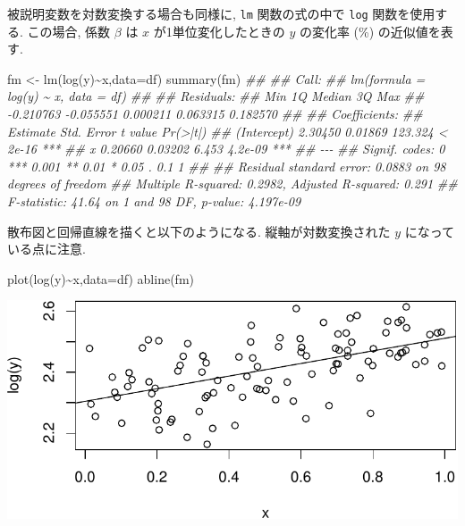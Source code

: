\documentclass[
  letterpaper,
  xelatex,
  ja=standard, xelatex]{bxjsbook}
\newenvironment{Shaded}{\begin{snugshade}}{\end{snugshade}}
\newcommand{\AttributeTok}[1]{\textcolor[rgb]{0.40,0.45,0.13}{#1}}
\newcommand{\DocumentationTok}[1]{\textcolor[rgb]{0.37,0.37,0.37}{\textit{#1}}}
\newcommand{\FunctionTok}[1]{\textcolor[rgb]{0.28,0.35,0.67}{#1}}
\newcommand{\NormalTok}[1]{\textcolor[rgb]{0.00,0.23,0.31}{#1}}
\newcommand{\OtherTok}[1]{\textcolor[rgb]{0.00,0.23,0.31}{#1}}
\newcommand{\SpecialCharTok}[1]{\textcolor[rgb]{0.37,0.37,0.37}{#1}}
\begin{document}
被説明変数を対数変換する場合も同様に, \texttt{lm} 関数の式の中で
\texttt{log} 関数を使用する. この場合, 係数 \(\beta\) は \(x\)
が1単位変化したときの \(y\) の変化率 (\%) の近似値を表す.

\begin{Shaded}
\begin{Highlighting}[]
\NormalTok{fm }\OtherTok{\textless{}{-}} \FunctionTok{lm}\NormalTok{(}\FunctionTok{log}\NormalTok{(y)}\SpecialCharTok{\textasciitilde{}}\NormalTok{x,}\AttributeTok{data=}\NormalTok{df)}
\FunctionTok{summary}\NormalTok{(fm)}
\DocumentationTok{\#\# }
\DocumentationTok{\#\# Call:}
\DocumentationTok{\#\# lm(formula = log(y) \textasciitilde{} x, data = df)}
\DocumentationTok{\#\# }
\DocumentationTok{\#\# Residuals:}
\DocumentationTok{\#\#       Min        1Q    Median        3Q       Max }
\DocumentationTok{\#\# {-}0.210763 {-}0.055551  0.000211  0.063315  0.182570 }
\DocumentationTok{\#\# }
\DocumentationTok{\#\# Coefficients:}
\DocumentationTok{\#\#             Estimate Std. Error t value Pr(\textgreater{}|t|)    }
\DocumentationTok{\#\# (Intercept)  2.30450    0.01869 123.324  \textless{} 2e{-}16 ***}
\DocumentationTok{\#\# x            0.20660    0.03202   6.453  4.2e{-}09 ***}
\DocumentationTok{\#\# {-}{-}{-}}
\DocumentationTok{\#\# Signif. codes:  0 \textquotesingle{}***\textquotesingle{} 0.001 \textquotesingle{}**\textquotesingle{} 0.01 \textquotesingle{}*\textquotesingle{} 0.05 \textquotesingle{}.\textquotesingle{} 0.1 \textquotesingle{} \textquotesingle{} 1}
\DocumentationTok{\#\# }
\DocumentationTok{\#\# Residual standard error: 0.0883 on 98 degrees of freedom}
\DocumentationTok{\#\# Multiple R{-}squared:  0.2982, Adjusted R{-}squared:  0.291 }
\DocumentationTok{\#\# F{-}statistic: 41.64 on 1 and 98 DF,  p{-}value: 4.197e{-}09}
\end{Highlighting}
\end{Shaded}

散布図と回帰直線を描くと以下のようになる. 縦軸が対数変換された \(y\)
になっている点に注意.

\begin{Shaded}
\begin{Highlighting}[]
\FunctionTok{plot}\NormalTok{(}\FunctionTok{log}\NormalTok{(y)}\SpecialCharTok{\textasciitilde{}}\NormalTok{x,}\AttributeTok{data=}\NormalTok{df)}
\FunctionTok{abline}\NormalTok{(fm)}
\end{Highlighting}
\end{Shaded}

\includegraphics{07-regression1_files/figure-pdf/unnamed-chunk-23-1.pdf}
\end{document}
